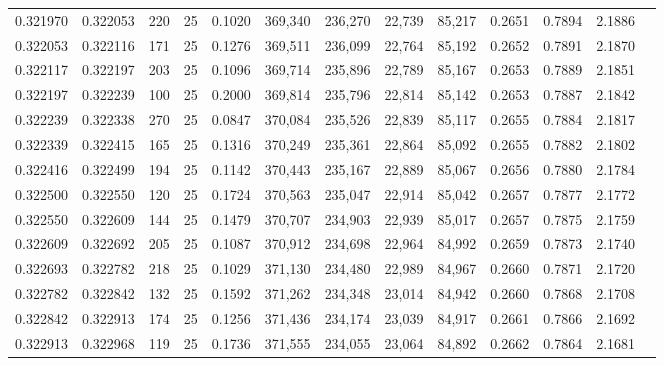 \begin{tabular}{rrrrrrrrrrrrr}
0.321970 & 0.322053 &   220 &  25 &                                     0.1020 & 369,340 & 236,270 &  22,739 &  85,217 & 0.2651 & 0.7894 & 2.1886 \\
0.322053 & 0.322116 &   171 &  25 &                                     0.1276 & 369,511 & 236,099 &  22,764 &  85,192 & 0.2652 & 0.7891 & 2.1870 \\
0.322117 & 0.322197 &   203 &  25 &                                     0.1096 & 369,714 & 235,896 &  22,789 &  85,167 & 0.2653 & 0.7889 & 2.1851 \\
0.322197 & 0.322239 &   100 &  25 &                                     0.2000 & 369,814 & 235,796 &  22,814 &  85,142 & 0.2653 & 0.7887 & 2.1842 \\
0.322239 & 0.322338 &   270 &  25 &                                     0.0847 & 370,084 & 235,526 &  22,839 &  85,117 & 0.2655 & 0.7884 & 2.1817 \\
0.322339 & 0.322415 &   165 &  25 &                                     0.1316 & 370,249 & 235,361 &  22,864 &  85,092 & 0.2655 & 0.7882 & 2.1802 \\
0.322416 & 0.322499 &   194 &  25 &                                     0.1142 & 370,443 & 235,167 &  22,889 &  85,067 & 0.2656 & 0.7880 & 2.1784 \\
0.322500 & 0.322550 &   120 &  25 &                                     0.1724 & 370,563 & 235,047 &  22,914 &  85,042 & 0.2657 & 0.7877 & 2.1772 \\
0.322550 & 0.322609 &   144 &  25 &                                     0.1479 & 370,707 & 234,903 &  22,939 &  85,017 & 0.2657 & 0.7875 & 2.1759 \\
0.322609 & 0.322692 &   205 &  25 &                                     0.1087 & 370,912 & 234,698 &  22,964 &  84,992 & 0.2659 & 0.7873 & 2.1740 \\
0.322693 & 0.322782 &   218 &  25 &                                     0.1029 & 371,130 & 234,480 &  22,989 &  84,967 & 0.2660 & 0.7871 & 2.1720 \\
0.322782 & 0.322842 &   132 &  25 &                                     0.1592 & 371,262 & 234,348 &  23,014 &  84,942 & 0.2660 & 0.7868 & 2.1708 \\
0.322842 & 0.322913 &   174 &  25 &                                     0.1256 & 371,436 & 234,174 &  23,039 &  84,917 & 0.2661 & 0.7866 & 2.1692 \\
0.322913 & 0.322968 &   119 &  25 &                                     0.1736 & 371,555 & 234,055 &  23,064 &  84,892 & 0.2662 & 0.7864 & 2.1681 \\

\end{tabular}
